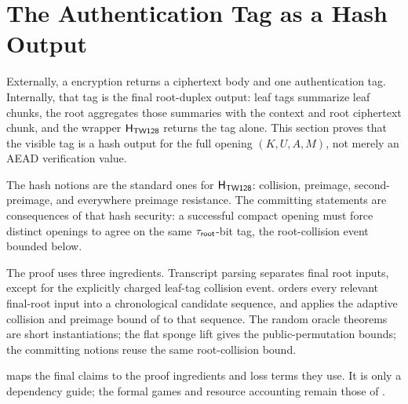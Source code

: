 \section{The Authentication Tag as a Hash Output}
\label{sec:root-tag-hash-security}

Externally, a \TW{} encryption returns a ciphertext body and one authentication
tag. Internally, that tag is the final root-duplex output: leaf tags summarize
leaf chunks, the root aggregates those summaries with the context and root
ciphertext chunk, and the wrapper $\mathsf{H}_{\mathsf{TW128}}$ returns the tag alone. This section
proves that the visible tag is a hash output for the full opening
$(K, U, A, M)$, not merely an AEAD verification value.

The hash notions are the standard ones for $\mathsf{H}_{\mathsf{TW128}}$: collision,
preimage, second-preimage, and everywhere preimage resistance. The committing
statements are consequences of that hash security: a successful compact opening
must force distinct openings to agree on the same $\tau_{\mathsf{root}}$-bit tag, the
root-collision event bounded below.

The proof uses three ingredients. Transcript parsing separates final root
inputs, except for the explicitly charged leaf-tag collision event.
 orders every relevant final-root input into a
chronological candidate sequence, and  applies the
adaptive collision and preimage bound of  to that sequence.
The random oracle theorems are short instantiations; the flat sponge lift gives
the public-permutation bounds; the \cite{BH22} committing notions reuse the
same root-collision bound.

 maps the final claims to the proof ingredients
and loss terms they use. It is only a dependency guide; the formal games and
resource accounting remain those of .

